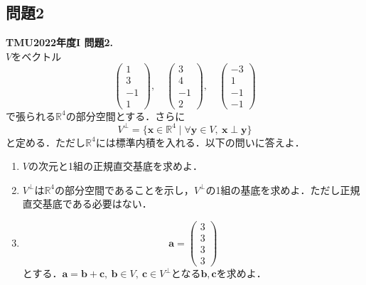 \documentclass[titlepage]{jsarticle}
\numberwithin{equation}{section}
\begin{document}
\subsection{問題2}
\begin{problem}
\textbf{TMU2022年度I 問題2.}\\
$V$をベクトル
\[
\begin{pmatrix}
1 \\ 3 \\ -1 \\ 1
\end{pmatrix},
\quad
\begin{pmatrix}
3 \\ 4 \\ -1 \\ 2
\end{pmatrix},
\quad
\begin{pmatrix}
-3 \\ 1 \\ -1 \\ -1
\end{pmatrix}
\]
で張られる$\mathbb{R}^4$の部分空間とする．さらに
\[
V^\perp=\{\bm{x}\in\mathbb{R}^4 \mid \forall \bm{y}\in V,\ \bm{x}\perp\bm{y}\}
\]
と定める．ただし$\mathbb{R}^4$には標準内積を入れる．以下の問いに答えよ．

\begin{enumerate}[label=(\arabic*)]
\item $V$の次元と1組の正規直交基底を求めよ．
\item $V^\perp$は$\mathbb{R}^4$の部分空間であることを示し，$V^\perp$の1組の基底を求めよ．ただし正規直交基底である必要はない．
\item 
\[
\bm{a}=
\begin{pmatrix}
3 \\ 3 \\ 3 \\ 3
\end{pmatrix}
\]
とする．$\bm{a}=\bm{b}+\bm{c},\ \bm{b}\in V,\ \bm{c}\in V^\perp$となる$\bm{b},\bm{c}$を求めよ．
\end{enumerate}
\end{problem}
\end{document}
